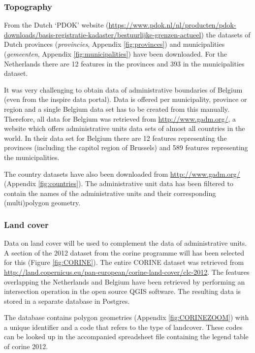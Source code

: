 \subsubsection{Topography}
\begin{sloppypar}
	From the Dutch `PDOK' website (\url{https://www.pdok.nl/nl/producten/pdok-downloads/basis-registratie-kadaster/bestuurlijke-grenzen-actueel}) the datasets of Dutch provinces (\textit{provincies}, Appendix \ref{fig:provinces}) and municipalities (\textit{gemeenten}, Appendix \ref{fig:municipalities}) have been downloaded. For the Netherlands there are 12 features in the provinces and 393 in the municipalities dataset. 
	
	It was very challenging to obtain data of administrative boundaries of Belgium (even from the \ac{inspire} data portal). Data is offered per municipality, province or region and a single Belgium data set has to be created from this manually. Therefore, all data for Belgium was retrieved from \url{http://www.gadm.org/}, a website which offers administrative units data sets of almost all countries in the world. In their data set for Belgium there are 12 features representing the provinces (including the capitol region of Brussels) and 589 features representing the municipalities.  
	
	The country datasets have also been downloaded from \url{http://www.gadm.org/} (Appendix \ref{fig:countries}). The administrative unit data has been filtered to contain the names of the administrative units and their corresponding (multi)polygon geometry. 
\end{sloppypar}

\subsubsection{Land cover}
\begin{sloppypar}
	Data on land cover will be used to complement the data of administrative units. A section of the 2012 dataset from the \ac{corine} programme will has been selected for this (Figure \ref{fig:CORINE}). The entire CORINE dataset was retrieved from \url{http://land.copernicus.eu/pan-european/corine-land-cover/clc-2012}. The features overlapping the Netherlands and Belgium have been retrieved by performing an intersection operation in the open source QGIS software. The resulting data is stored in a separate database in Postgres. 
	
	The database contains polygon geometries (Appendix \ref{fig:CORINEZOOM}) with a unique identifier and a code that refers to the type of landcover. These codes can be looked up in the accompanied spreadsheet file containing the legend table of \ac{corine} 2012.  	
\end{sloppypar}

